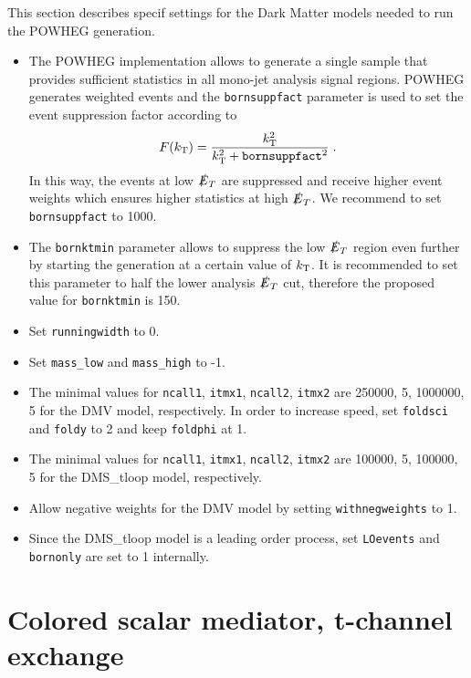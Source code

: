 This section describes specif settings for the Dark Matter models needed to run the POWHEG generation.
\begin{itemize}
\item The POWHEG implementation allows to generate a single sample that provides sufficient statistics in all mono-jet analysis signal regions. %
POWHEG generates weighted events and the \verb+bornsuppfact+ parameter is used to set the event suppression factor according to
\begin{equation}
F(k_{\rm{T}})=\frac{k_{\rm{T}}^2}{k_{\rm{T}}^2+\texttt{bornsuppfact}^2} \;.
\end{equation}
In this way, the events at low $\slashed{E}_T$ are suppressed and receive higher event weights which ensures higher statistics at high $\slashed{E}_T$. We recommend to set \verb+bornsuppfact+ to 1000.
\item The \verb+bornktmin+ parameter allows to suppress the low $\slashed{E}_T$ region even further by starting the generation at a certain value of $k_{\rm{T}}$. It is recommended to set this parameter  to half the lower analysis $\slashed{E}_T$ cut, therefore the proposed value for \verb+bornktmin+ is 150.

\item Set \verb+runningwidth+ to 0.
\item Set \verb+mass_low+ and \verb+mass_high+ to -1.
\item The minimal values for \verb+ncall1+, \verb+itmx1+, \verb+ncall2+, \verb+itmx2+ are 250000, 5, 1000000, 5 for the DMV model, respectively. In order to increase speed, set \verb+foldsci+ and \verb+foldy+ to 2 and keep \verb+foldphi+ at 1. 
\item The minimal values for \verb+ncall1+, \verb+itmx1+, \verb+ncall2+, \verb+itmx2+ are 100000, 5, 100000, 5 for the DMS\_tloop model, respectively.
\item Allow negative weights for the DMV model by setting \verb+withnegweights+ to 1.
\item Since the DMS\_tloop model is a leading order process, set \verb+LOevents+ and \verb+bornonly+ are set to 1 internally.
\end{itemize}


\section{Colored scalar mediator, t-channel exchange}



